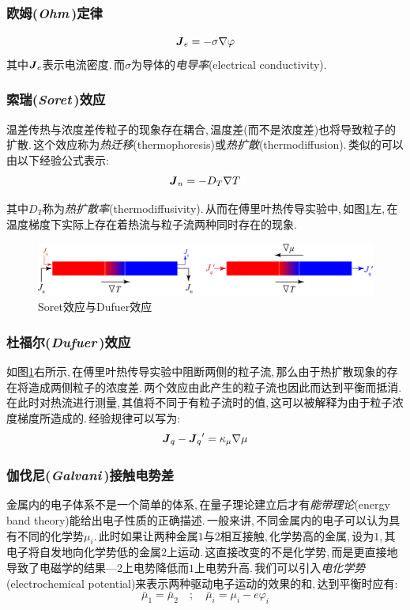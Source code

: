 \subsubsection{\hei 欧姆({\it Ohm\,})定律}
\[\boldsymbol{J}_e=-\sigma\nabla \varphi\]
其中\(\boldsymbol{J}_e\)表示电流密度.\,而\(\sigma\)为导体的\emph{电导率}(electrical conductivity).

\subsubsection{\hei 索瑞({\it Soret\,})效应}
温差传热与浓度差传粒子的现象存在耦合,\,温度差(而不是浓度差)也将导致粒子的扩散.\,这个效应称为\emph{热迁移}(thermophoresis)或\emph{热扩散}(thermodiffusion).\,类似的可以由以下经验公式表示:
\[\boldsymbol{J}_n=-D_T\nabla T\]

其中\(D_T\)称为\emph{热扩散率}(thermodiffusivity).\,从而在傅里叶热传导实验中,\,如图\ref{fig5-2-20}左,\,在温度梯度下实际上存在着热流与粒子流两种同时存在的现象.
\begin{figure}[H]
\centering
\includegraphics[width=16cm]{image/5-2-20.png}
\caption{Soret效应与Dufuer效应}\label{fig5-2-20}
\end{figure}

\subsubsection{\hei 杜福尔({\it Dufuer\,})效应}
如图\ref{fig5-2-20}右所示,\,在傅里叶热传导实验中阻断两侧的粒子流,\,那么由于热扩散现象的存在将造成两侧粒子的浓度差.\,两个效应由此产生的粒子流也因此而达到平衡而抵消.\,在此时对热流进行测量,\,其值将不同于有粒子流时的值,\,这可以被解释为由于粒子浓度梯度所造成的.\,经验规律可以写为:
\[\boldsymbol{J}_q-{\boldsymbol{J}_q}^\prime=\kappa_\mu\nabla\mu\]

\subsubsection{\hei 伽伐尼({\it Galvani\,})接触电势差}

金属内的电子体系不是一个简单的体系,\,在量子理论建立后才有\emph{能带理论}(energy band theory)能给出电子性质的正确描述.\,一般来讲,\,不同金属内的电子可以认为具有不同的化学势\(\mu_i\).\,此时如果让两种金属\(1\)与\(2\)相互接触,\,化学势高的金属,\,设为\(1\),\,其电子将自发地向化学势低的金属\(2\)上运动.\,这直接改变的不是化学势,\,而是更直接地导致了电磁学的结果---\(2\)上电势降低而\(1\)上电势升高.\,我们可以引入\emph{电化学势}(electrochemical potential)来表示两种驱动电子运动的效果的和,\,达到平衡时应有:
\[\bar{\mu}_1=\bar{\mu}_2\quad ; \quad \bar{\mu}_i=\mu_i-e\varphi_i\]

